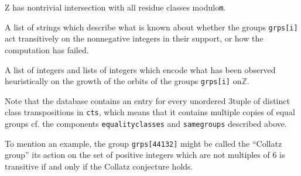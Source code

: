 \documentclass[a4paper,11pt]{report}
\begin{document}
{{{\begin{description}
{{Z}} has nontrivial intersection with all residue classes modulo{\nobreakspace}\texttt{m}. 
\item[{\texttt{trsstatus}}]  A list of strings which describe what is known about whether the groups \texttt{grps[i]} act transitively on the nonnegative integers in their support, or how the
computation has failed. 
\item[{\texttt{orbitgrowthtype}}]  A list of integers and lists of integers which encode what has been observed
heuristically on the growth of the orbits of the groups \texttt{grps[i]} on{\nobreakspace}{\ensuremath{\mathbb Z}}. 
\end{description}
 Note that the database contains an entry for every unordered
3\texttt{}tuple of distinct class transpositions in \texttt{cts}, which means that it contains multiple copies of equal groups
\texttt{}\texttt{} cf. the components \texttt{equalityclasses} and \texttt{samegroups} described above. 

 To mention an example, the group \texttt{grps[44132]} might be called the ``Collatz group'' \texttt{}\texttt{} its action on the set of positive
integers which are not multiples of 6 is transitive if and only if the Collatz
conjecture holds. 
\begin{Verbatim}[commandchars=!@|,fontsize=\small,frame=single,label=Example]
  

\end{Verbatim}}}}
\end{document}
